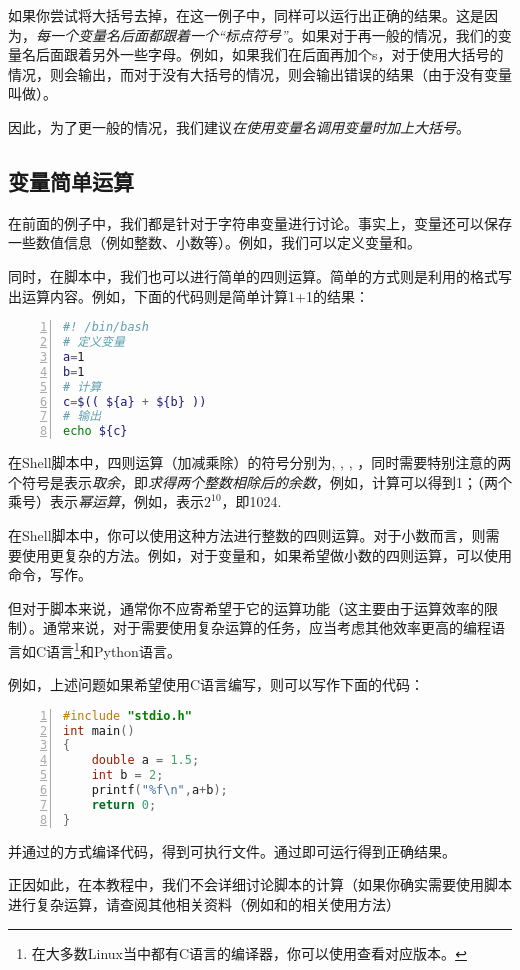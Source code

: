 \begin{extend}
    如果你尝试将大括号去掉，在这一例子中，同样可以运行出正确的结果。这是因为，\emph{每一个变量名后面都跟着一个“标点符号”}。如果对于再一般的情况，我们的变量名后面跟着另外一些字母。例如，如果我们在后面再加个s，对于使用大括号的情况，则会输出，而对于没有大括号的情况，则会输出错误的结果（由于没有变量叫做）。

    因此，为了更一般的情况，我们建议\emph{在使用变量名调用变量时加上大括号}。
\end{extend}

\subsection{变量简单运算}\label{subsec:变量-变量简单运算}

在前面的例子中，我们都是针对于字符串变量进行讨论。事实上，变量还可以保存一些数值信息（例如整数、小数等）。例如，我们可以定义变量和。

同时，在脚本中，我们也可以进行简单的四则运算。简单的方式则是利用的格式写出运算内容。例如，下面的代码则是简单计算1+1的结果：

\begin{lstlisting}[language=bash,caption=calculate,numbers=left]
#! /bin/bash
# 定义变量
a=1
b=1
# 计算
c=$(( ${a} + ${b} ))
# 输出
echo ${c}
\end{lstlisting}

在Shell脚本中，四则运算（加减乘除）的符号分别为\code{+}, \code{-}, \code{*}, \code{/}，同时需要特别注意的两个符号是\code{\%}表示\emph{取余}，即\emph{求得两个整数相除后的余数}，例如，计算可以得到1；\code{**}（两个乘号）表示\emph{幂运算}，例如，表示$2^{10}$，即1024.

\begin{extend}
    在Shell脚本中，你可以使用这种方法进行整数的四则运算。对于小数而言，则需要使用更复杂的方法。例如，对于变量和，如果希望做小数的四则运算，可以使用命令，写作。

    但对于脚本来说，通常你不应寄希望于它的运算功能（这主要由于运算效率的限制）。通常来说，对于需要使用复杂运算的任务，应当考虑其他效率更高的编程语言如C语言\footnote{在大多数Linux当中都有C语言的编译器，你可以使用查看对应版本。}和Python语言。

    例如，上述问题如果希望使用C语言编写，则可以写作下面的代码：

    \begin{lstlisting}[language=C,caption=calculate.c,numbers=left]
#include "stdio.h"
int main()
{
    double a = 1.5;
    int b = 2;
    printf("%f\n",a+b);
    return 0;
}   
    \end{lstlisting}
    并通过的方式编译代码，得到可执行文件。通过即可运行得到正确结果。

    正因如此，在本教程中，我们不会详细讨论脚本的计算（如果你确实需要使用脚本进行复杂运算，请查阅其他相关资料（例如和的相关使用方法）
\end{extend}

